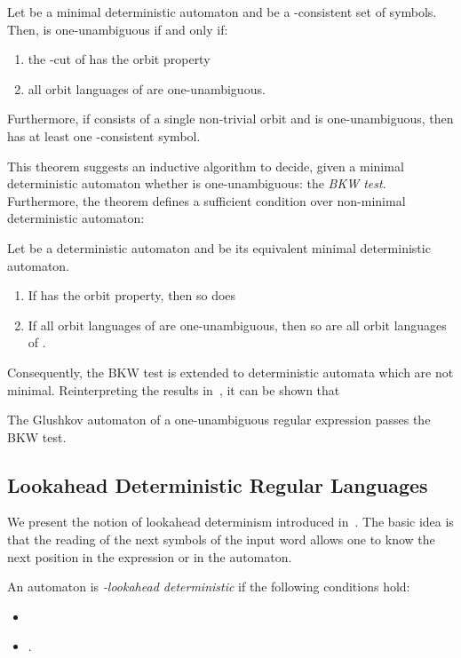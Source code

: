 \documentclass{llncs}
\begin{document}
\begin{theorem}[\cite{BW98}]\label{th:1NA}
	Let  be a minimal deterministic automaton and  be a -consistent set of symbols. 
	Then,  is one-unambiguous if and only if:
	\begin{enumerate}
		\item the -cut  of  has the orbit property
		\item all orbit languages of  are one-unambiguous.
	\end{enumerate}
	Furthermore, if  consists of a single non-trivial orbit and  is one-unambi\-guous, then  has at least one -consistent symbol.
\end{theorem}
	This theorem suggests an inductive algorithm to decide, given a minimal deterministic automaton  whether  is one-unambiguous: 
	the \emph{BKW test}.
Furthermore, the theorem defines a sufficient condition over non-minimal deterministic automaton:

\begin{lemma}[\cite{BW98}]\label{lm:1NA}
	Let  be a deterministic automaton and  be its equivalent minimal deterministic automaton.
	\begin{enumerate}
		\item If  has the orbit property, then so does 
		\item If all orbit languages of  are one-unambiguous, then so are all orbit languages of .
	\end{enumerate}
\end{lemma}
	Consequently, 
	the BKW test is extended to deterministic automata which are not minimal.
	Reinterpreting the results in~\cite{BW98}, it can be shown that
	
\begin{lemma}\label{lm:GlushkovBKW}
	  The Glushkov automaton of a one-unambiguous regular expression passes the BKW test.
\end{lemma}
	
	
\subsection{Lookahead Deterministic Regular Languages}

	We present the notion of lookahead determinism introduced in~\cite{HW08}.
	The basic idea is that the reading of the next  symbols of the input word allows one to know the next position in the expression or in the automaton.
	
\begin{definition}
	An automaton  is \emph{-lookahead deterministic} if the following conditions hold:
	\begin{itemize}
		\item 
		\item .
	\end{itemize}
\end{definition}
\end{document}
